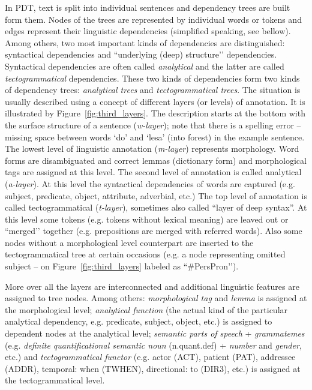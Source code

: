 In PDT, text is split into individual sentences and dependency trees are built form them. Nodes of the trees are represented by individual words or tokens and edges represent their linguistic dependencies (simplified speaking, see bellow). Among others, two most important kinds of dependencies are distinguished: syntactical dependencies and ``underlying (deep) structure’’ dependencies. Syntactical dependencies are often called \emph{analytical} and the latter are called \emph{tectogrammatical} dependencies. These two kinds of dependencies form two kinds of dependency trees: \emph{analytical trees} and \emph{tectogrammatical trees}. The situation is usually described using a concept of different layers (or levels) of annotation. It is illustrated by Figure~\ref{fig:third_layers}. The description starts at the bottom with the surface structure of a sentence (\emph{w-layer}); note that there is a spelling error -- missing space between words `do’ and `lesa’ (into forest) in the example sentence. The lowest level of linguistic annotation (\emph{m-layer}) represents morphology. Word forms are disambiguated and correct lemmas (dictionary form) and morphological tags are assigned at this level. The second level of annotation is called analytical (\emph{a-layer}). At this level the syntactical dependencies of words are captured (e.g. subject, predicate, object, attribute, adverbial, etc.) The top level of annotation is called tectogrammatical (\emph{t-layer}), sometimes also called ``layer of deep syntax''. At this level some tokens (e.g. tokens without lexical meaning) are leaved out or ``merged’’ together (e.g. prepositions are merged with referred words). Also some nodes without a morphological level counterpart are inserted to the tectogrammatical tree at certain occasions (e.g. a node representing omitted subject -- on Figure~\ref{fig:third_layers} labeled as ``\#PersPron’’).  

More over all the layers are interconnected and additional linguistic features are assigned to tree nodes. Among others: \emph{morphological tag} and \emph{lemma} is assigned at the morphological level; \emph{analytical function} (the actual kind of the particular analytical dependency, e.g. predicate, subject, object, etc.) is assigned to dependent nodes at the analytical level; \emph{semantic parts of speech} + \emph{grammatemes} (e.g. \emph{definite quantificational semantic noun} (n.quant.def) + \emph{number} and \emph{gender}, etc.) and \emph{tectogrammatical functor} (e.g. actor (ACT), patient (PAT), addressee (ADDR), temporal: when (TWHEN), directional: to (DIR3), etc.) is assigned at the tectogrammatical level. 


